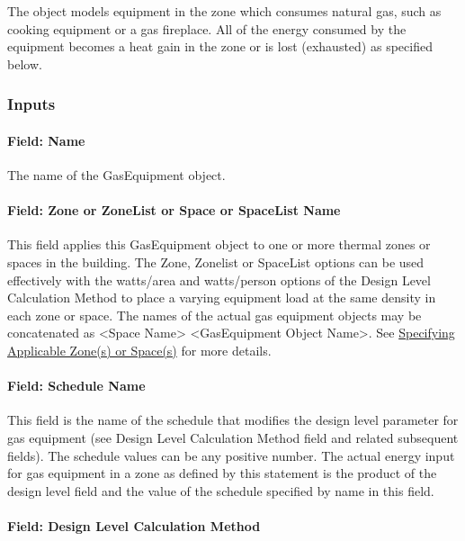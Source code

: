 The object models equipment in the zone which consumes natural gas, such as cooking equipment or a gas fireplace. All of the energy consumed by the equipment becomes a heat gain in the zone or is lost (exhausted) as specified below.

\subsubsection{Inputs}\label{inputs-4-017}

\paragraph{Field: Name}\label{field-name-4-014}

The name of the GasEquipment object.

\paragraph{Field: Zone or ZoneList or Space or SpaceList Name}\label{gaseq-field-zone-or-zonelist-name-000}

This field applies this GasEquipment object to one or more thermal zones or spaces in the building. The Zone, Zonelist or SpaceList options can be used effectively with the watts/area and watts/person options of the Design Level Calculation Method to place a varying equipment load at the same density in each zone or space. The names of the actual gas equipment objects may be concatenated as \textless{}Space Name\textgreater{} \textless{}GasEquipment Object Name\textgreater{}. See \hyperref[specifying-applicable-zones-or-spaces]{Specifying Applicable Zone(s) or Space(s)} for more details.

\paragraph{Field: Schedule Name}\label{field-schedule-name-2-001}

This field is the name of the schedule that modifies the design level parameter for gas equipment (see Design Level Calculation Method field and related subsequent fields). The schedule values can be any positive number. The actual energy input for gas equipment in a zone as defined by this statement is the product of the design level field and the value of the schedule specified by name in this field.

\paragraph{Field: Design Level Calculation Method}\label{field-design-level-calculation-method-2}

